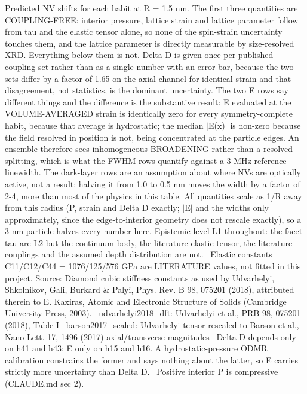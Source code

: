 \begin{table}[htbp]
  \centering
  \caption{Predicted NV shifts for each habit at R = 1.5 nm. The first three quantities are COUPLING-FREE: interior pressure, lattice strain and lattice parameter follow from tau and the elastic tensor alone, so none of the spin-strain uncertainty touches them, and the lattice parameter is directly measurable by size-resolved XRD. Everything below them is not. Delta D is given once per published coupling set rather than as a single number with an error bar, because the two sets differ by a factor of 1.65 on the axial channel for identical strain and that disagreement, not statistics, is the dominant uncertainty. The two E rows say different things and the difference is the substantive result: E evaluated at the VOLUME-AVERAGED strain is identically zero for every symmetry-complete habit, because that average is hydrostatic; the median $|$E(x)$|$ is non-zero because the field resolved in position is not, being concentrated at the particle edges. An ensemble therefore sees inhomogeneous BROADENING rather than a resolved splitting, which is what the FWHM rows quantify against a 3 MHz reference linewidth. The dark-layer rows are an assumption about where NVs are optically active, not a result: halving it from 1.0 to 0.5 nm moves the width by a factor of 2-4, more than most of the physics in this table. All quantities scale as 1/R away from this radius (P, strain and Delta D exactly; $|$E$|$ and the widths only approximately, since the edge-to-interior geometry does not rescale exactly), so a 3 nm particle halves every number here. Epistemic level L1 throughout: the facet tau are L2 but the continuum body, the literature elastic tensor, the literature couplings and the assumed depth distribution are not. \textbullet\ Elastic constants C11/C12/C44 = 1076/125/576 GPa are LITERATURE values, not fitted in this project. Source: Diamond cubic stiffness constants as used by Udvarhelyi, Shkolnikov, Gali, Burkard \& Palyi, Phys. Rev. B 98, 075201 (2018), attributed therein to E. Kaxiras, Atomic and Electronic Structure of Solids (Cambridge University Press, 2003). \textbullet\ udvarhelyi2018\_dft: Udvarhelyi et al., PRB 98, 075201 (2018), Table I \textbullet\ barson2017\_scaled: Udvarhelyi tensor rescaled to Barson et al., Nano Lett. 17, 1496 (2017) axial/transverse magnitudes \textbullet\ Delta D depends only on h41 and h43; E only on h15 and h16. A hydrostatic-pressure ODMR calibration constrains the former and says nothing about the latter, so E carries strictly more uncertainty than Delta D. \textbullet\ Positive interior P is compressive (CLAUDE.md sec 2).}

\end{table}
